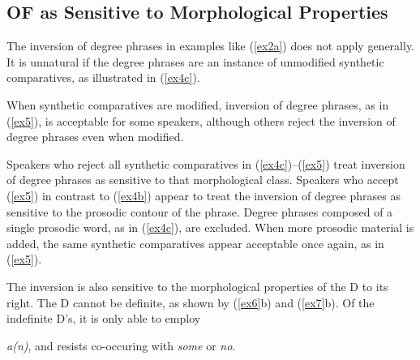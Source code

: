 \documentclass[output=paper,
modfonts
]{LSP/langsci}
\begin{document}
{\subsection{OF as Sensitive to Morphological Properties}
The inversion of degree phrases in examples like ({\ref{ex2a}}) does not apply generally.  It is unnatural if the degree phrases are an instance of unmodified synthetic comparatives, as illustrated in ({\ref{ex4c}}).
\begin{exe}
\ex \label{ex4c}
\begin{xlist}
\end{xlist}
\end{exe}

When synthetic comparatives are modified, inversion of degree phrases, as in ({\ref{ex5}}), is acceptable for some speakers, although others reject the inversion of degree phrases even when modified.
\begin{exe}
\ex \label{ex5}
\begin{xlist}
\end{xlist}
\end{exe}

Speakers who reject all synthetic comparatives in ({\ref{ex4c}})--({\ref{ex5}}) treat inversion of degree phrases as sensitive to that morphological class.  Speakers who accept ({\ref{ex5}}) in contrast to ({\ref{ex4b}}) appear to treat the inversion of degree phrases as sensitive to the prosodic contour of the phrase.  Degree phrases composed of a single prosodic word, as in ({\ref{ex4c}}), are excluded.  When more prosodic material is added, the same synthetic comparatives appear acceptable once again, as in ({\ref{ex5}}).  


The inversion is also sensitive to the morphological properties of the D to its right.  The D cannot be definite, as shown by ({\ref{ex6}}b) and ({\ref{ex7}}b).  Of the indefinite D's, it is only able to employ {\textit{a(n)}, and resists co-occuring with {\textit{some}} or {\textit{no}}.

\begin{exe}
\ex \label{ex6}
\begin{xlist}
\end{xlist}



\end{exe}}}
\end{document}
